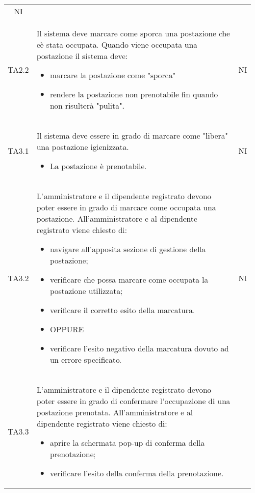 {\begin{longtable}{ c C{11cm} c }
        NI\\
        TA2.2&
        Il sistema deve marcare come sporca una postazione che e\`{e} stata occupata.\newline
        Quando viene occupata una postazione il sistema deve:
        \begin{itemize}
            \item marcare la postazione come "sporca"
            \item rendere la postazione non prenotabile fin quando non risulter\`{a} "pulita".
        \end{itemize}&
        NI\\
        TA3.1&
        Il sistema deve essere in grado di marcare come "libera" una postazione igienizzata.\newline
        \begin{itemize}
            \item La postazione \`{e} prenotabile.
        \end{itemize}&
        NI\\
        TA3.2&
        L'amministratore e il dipendente registrato devono poter essere in grado di marcare come occupata una postazione.\newline
        All'amministratore e al dipendente registrato viene chiesto di:
        \begin{itemize}
            \item navigare all'apposita sezione di gestione della postazione;
            \item verificare che possa marcare come occupata la postazione utilizzata;
            \item verificare il corretto esito della marcatura.
            \item [] OPPURE
            \item verificare l'esito negativo della marcatura dovuto ad un errore specificato.
        \end{itemize}&
        NI\\
        TA3.3&
        L'amministratore e il dipendente registrato devono poter essere in grado di confermare l'occupazione di una postazione prenotata.\newline
        All'amministratore e al dipendente registrato viene chiesto di:
        \begin{itemize}
            \item aprire la schermata pop-up di conferma della prenotazione;
            \item verificare l'esito della conferma della prenotazione.

\end{itemize}
\end{longtable}}
